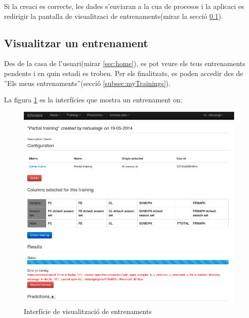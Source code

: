 Si la creaci \´e{s} correcte, les dades s'enviaran a la cua de procesos i la aplicaci es redirigir la pantalla de visualitzaci de entrenaments(mirar la secció \ref{subsec:viewtraining}).

\subsection{Visualitzar un entrenament}
\label{subsec:viewtraining}
Des de la casa de l'usuari(mirar \ref{sec:home}), es pot veure els teus entrenaments pendents i en quin estadi es troben. Per els finalitzats, es poden accedir des de ''Els meus entrenaments''(secció \ref{subsec:myTrainings}).

La figura \ref{fig:viewTraining} es la interfícies que mostra un entrenament on:
\begin{figure}[h!]
  \centering
  \includegraphics[scale=0.5]{img/userguide/view_training_pending.png}
  \caption{Interfície de visualització de entrenaments}
  \label{fig:viewTraining}
\end{figure}

